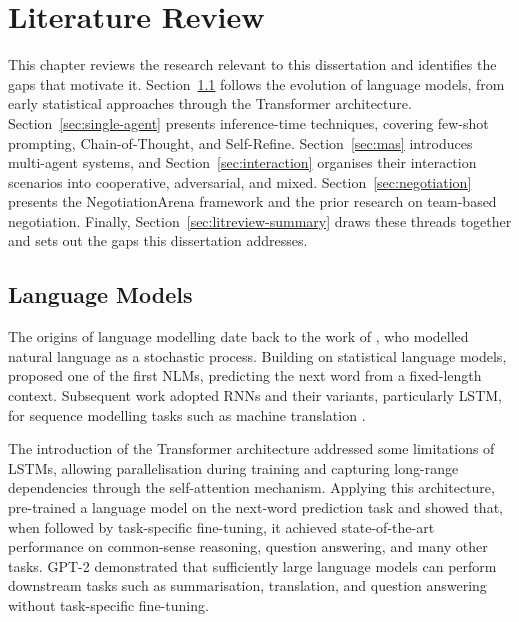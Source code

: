     

\chapter{Literature Review} \label{chap:litreview}

This chapter reviews the research relevant to this dissertation and identifies the gaps that motivate it. Section~\ref{sec:llm-agents} follows the evolution of language models, from early statistical approaches through the Transformer architecture. Section~\ref{sec:single-agent} presents inference-time techniques, covering few-shot prompting, Chain-of-Thought, and Self-Refine. Section~\ref{sec:mas} introduces multi-agent systems, and Section~\ref{sec:interaction} organises their interaction scenarios into cooperative, adversarial, and mixed. Section~\ref{sec:negotiation} presents the NegotiationArena framework and the prior research on team-based negotiation. Finally, Section~\ref{sec:litreview-summary} draws these threads together and sets out the gaps this dissertation addresses.

\section{Language Models} \label{sec:llm-agents}

The origins of language modelling date back to the work of \textcite{6773024}, who modelled natural language as a stochastic process. Building on statistical language models, \textcite{bengio_neural_2003} proposed one of the first \acp{NLM}, predicting the next word from a fixed-length context. Subsequent work adopted \acp{RNN} and their variants, particularly \ac{LSTM}, for sequence modelling tasks such as machine translation \parencite{sutskever2014sequencesequencelearningneural}.

The introduction of the Transformer architecture \parencite{vaswani2023attentionneed} addressed some limitations of \acp{LSTM}, allowing parallelisation during training and capturing long-range dependencies through the self-attention mechanism. Applying this architecture, \textcite{Radford2018ImprovingLU} pre-trained a language model on the next-word prediction task and showed that, when followed by task-specific fine-tuning, it achieved state-of-the-art performance on common-sense reasoning, question answering, and many other tasks. GPT-2 \parencite{Radford2019LanguageMA} demonstrated that sufficiently large language models can perform downstream tasks such as summarisation, translation, and question answering without task-specific fine-tuning.

